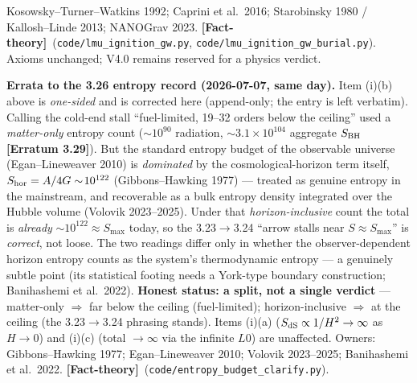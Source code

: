 \documentclass[11pt]{article}
\newcommand{\factth}{\textcolor{green!40!black}{\textbf{[Fact-theory]}}}
\begin{document}
{Kosowsky--Turner--Watkins 1992; Caprini et al.\ 2016; Starobinsky 1980 / Kallosh--Linde 2013; NANOGrav 2023. \factth\ (\texttt{code/lmu\_ignition\_gw.py}, \texttt{code/lmu\_ignition\_gw\_burial.py}). Axioms unchanged; V4.0 remains reserved for a physics verdict.

\smallskip\noindent\textbf{Errata to the 3.26 entropy record (2026-07-07, same day).} Item (i)(b) above is \emph{one-sided} and is corrected here (append-only; the entry is left verbatim). Calling the cold-end stall ``fuel-limited, 19--32 orders below the ceiling'' used a \emph{matter-only} entropy count ($\sim\!10^{90}$ radiation, $\sim\!3.1\times10^{104}$ aggregate $S_{\rm BH}$ \textbf{[Erratum 3.29]}). But the standard entropy budget of the observable universe (Egan--Lineweaver 2010) is \emph{dominated} by the cosmological-horizon term itself, $S_{\rm hor}=A/4G\sim\!10^{122}$ (Gibbons--Hawking 1977) --- treated as genuine entropy in the mainstream, and recoverable as a bulk entropy density integrated over the Hubble volume (Volovik 2023--2025). Under that \emph{horizon-inclusive} count the total is \emph{already} $\sim\!10^{122}\approx S_{\max}$ today, so the 3.23$\to$3.24 ``arrow stalls near $S\!\approx\!S_{\max}$'' is \emph{correct}, not loose. The two readings differ only in whether the observer-dependent horizon entropy counts as the system's thermodynamic entropy --- a genuinely subtle point (its statistical footing needs a York-type boundary construction; Banihashemi et al.\ 2022). \textbf{Honest status: a split, not a single verdict} --- matter-only $\Rightarrow$ far below the ceiling (fuel-limited); horizon-inclusive $\Rightarrow$ at the ceiling (the 3.23$\to$3.24 phrasing stands). Items (i)(a) ($S_{\rm dS}\propto1/H^2\to\infty$ as $H\to0$) and (i)(c) (total $\to\infty$ via the infinite $L0$) are unaffected. Owners: Gibbons--Hawking 1977; Egan--Lineweaver 2010; Volovik 2023--2025; Banihashemi et al.\ 2022. \factth\ (\texttt{code/entropy\_budget\_clarify.py}).

}
\end{document}
